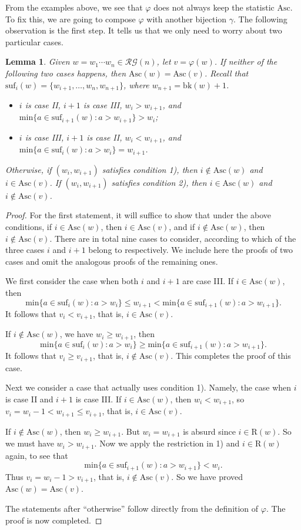 \documentclass[12pt]{amsart}
\numberwithin{equation}{section}
\theoremstyle{plain}
\newtheorem{lemma}[theorem]{Lemma}
\theoremstyle{definition}
\def\bk{\mathrm{bk}}
\def\Asc{\mathrm{Asc}}
\def\RR{\mathrm{R}}
\def\suf{\mathrm{suf}}
\def\min{\mathrm{min}}
\def\RG{\mathcal{RG}}
\begin{document}
From the examples above, we see that $\varphi$ does not
always keep the statistic $\Asc$. To fix this, we are going to compose $\varphi$ with another bijection $\gamma$. The following observation is the first step. It tells us that we only need to worry about two particular cases.

\begin{lemma}\label{notkeepasc}
Given $w=w_1\cdots w_n\in\RG(n)$, let $v=\varphi(w)$. If neither of the following two
cases happens, then $\Asc(w)=\Asc(v)$. Recall that $\suf_i(w)=\{w_{i+1},\ldots,w_n,w_{n+1}\}$, where $w_{n+1}=\bk(w)+1$.
\begin{itemize}
  \item[1)] $i$ is case II, $i+1$ is case III, $w_i>w_{i+1}$, and
  $\min\{a \in \suf_{i+1}(w): a >w_{i+1}\}>w_i$;
  \item[2)] $i$ is case III, $i+1$ is case II, $w_i<w_{i+1}$, and
  $\min\{a \in \suf_{i}(w): a >w_{i}\}=w_{i+1}$.
\end{itemize}
Otherwise, if $(w_i,w_{i+1})$ satisfies condition 1), then $i\notin\Asc(w)$ and $i\in \Asc(v)$. If $(w_i,w_{i+1})$ satisfies condition 2), then $i\in\Asc(w)$ and $i\notin \Asc(v)$.
\end{lemma}

\begin{proof}
For the first statement, it will suffice to show that under the above conditions, if $i \in \Asc(w)$, then $i \in \Asc(v)$, and if $i \notin \Asc(w)$, then $i \notin \Asc(v)$. There are in total nine cases to consider, according to which of the three cases $i$ and $i+1$ belong to respectively. We include here the proofs of two cases and omit the analogous proofs of the remaining ones.

We first consider the case when both $i$ and $i+1$ are case III.
If $i \in \Asc(w)$, then
\[
\min\{a \in \suf_i(w): a> w_i\} \leq w_{i+1} < \min\{a \in \suf_{i+1}(w): a> w_{i+1}\}.
\]
It follows that $v_i < v_{i+1}$, that is, $i \in \Asc(v)$.

If $i \notin \Asc(w)$, we have $w_i \ge w_{i+1}$, then
\[\min\{a \in \suf_{i}(w): a> w_i\} \geq \min\{a \in \suf_{i+1}(w): a> w_{i+1}\}.\] It follows that $v_i \geq v_{i+1}$, that is, $i \notin \Asc(v)$. This
completes the proof of this case.

Next we consider a case that actually uses condition 1). Namely, the case when $i$ is case II and $i+1$ is case III. If $i\in \Asc(w)$, then $w_i<w_{i+1}$, so $v_i=w_i-1<w_{i+1}\le v_{i+1}$, that is, $i\in \Asc(v)$.

If $i\notin \Asc(w)$, then $w_i\ge w_{i+1}$. But $w_i=w_{i+1}$ is absurd since $i\in \RR(w)$. So we must have $w_i>w_{i+1}$. Now we apply the restriction in 1) and $i\in \RR(w)$ again, to see that $$\min\{a \in \suf_{i+1}(w): a >w_{i+1}\}<w_i.$$ Thus $v_i=w_i-1 > v_{i+1}$, that is, $i\notin \Asc(v)$. So we have proved $\Asc(w)=\Asc(v)$.

The statements after ``otherwise'' follow directly from the definition of $\varphi$. The proof is now completed.
\end{proof}
\end{document}
